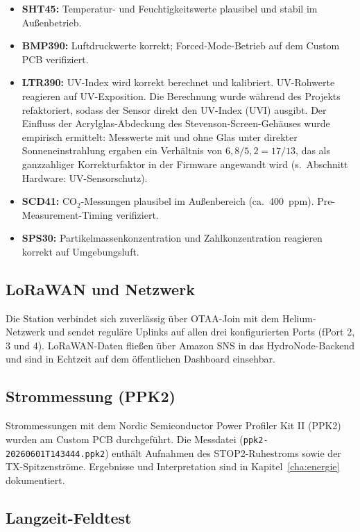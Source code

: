 \begin{itemize}
  \item \textbf{SHT45:} Temperatur- und Feuchtigkeitswerte plausibel und stabil im Außenbetrieb.
  \item \textbf{BMP390:} Luftdruckwerte korrekt; Forced-Mode-Betrieb auf dem Custom PCB verifiziert.
  \item \textbf{LTR390:} UV-Index wird korrekt berechnet und kalibriert. UV-Rohwerte reagieren auf UV-Exposition. Die Berechnung wurde während des Projekts refaktoriert, sodass der Sensor direkt den UV-Index (UVI) ausgibt. Der Einfluss der Acrylglas-Abdeckung des Stevenson-Screen-Gehäuses wurde empirisch ermittelt: Messwerte mit und ohne Glas unter direkter Sonneneinstrahlung ergaben ein Verhältnis von $6{,}8 / 5{,}2 = 17/13$, das als ganzzahliger Korrekturfaktor in der Firmware angewandt wird (s.\ Abschnitt Hardware: UV-Sensorschutz).
  \item \textbf{SCD41:} CO${}_2$-Messungen plausibel im Außenbereich (ca.\ 400~ppm). Pre-Measurement-Timing verifiziert.
  \item \textbf{SPS30:} Partikelmassenkonzentration und Zahlkonzentration reagieren korrekt auf Umgebungsluft.
\end{itemize}

\subsection*{LoRaWAN und Netzwerk}

Die Station verbindet sich zuverlässig über OTAA-Join mit dem Helium-Netzwerk und sendet reguläre Uplinks auf allen drei konfigurierten Ports (fPort 2, 3 und 4). LoRaWAN-Daten fließen über Amazon SNS in das HydroNode-Backend und sind in Echtzeit auf dem öffentlichen Dashboard einsehbar.

\subsection*{Strommessung (PPK2)}

Strommessungen mit dem Nordic Semiconductor Power Profiler Kit II (PPK2) wurden am Custom PCB durchgeführt. Die Messdatei (\texttt{ppk2-20260601T143444.ppk2}) enthält Aufnahmen des STOP2-Ruhestroms sowie der TX-Spitzenströme. Ergebnisse und Interpretation sind in Kapitel~\ref{cha:energie} dokumentiert.

\subsection*{Langzeit-Feldtest}

